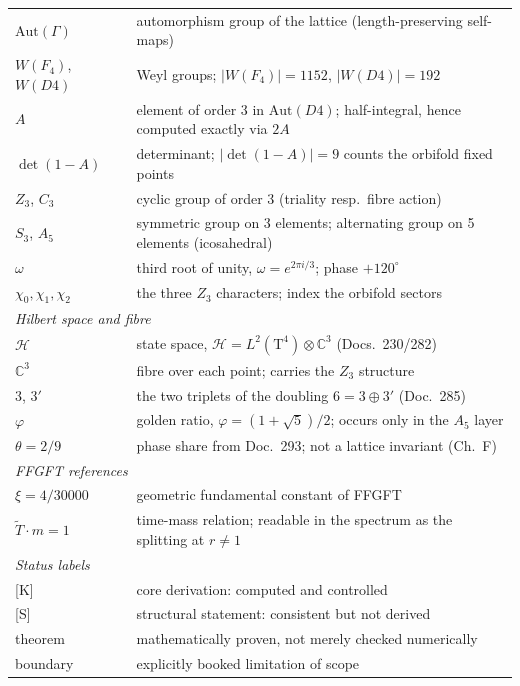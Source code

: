 \begin{center}
{\begin{longtable}{lp{9.6cm}}
$\text{Aut}(\Gamma)$ & automorphism group of the lattice
  (length-preserving self-maps) \\
$W(F_4)$, $W(D4)$ & Weyl groups; $|W(F_4)| = 1152$,
  $|W(D4)| = 192$ \\
$A$ & element of order 3 in $\text{Aut}(D4)$; half-integral, hence
  computed exactly via $2A$ \\
$\det(1-A)$ & determinant; $|\det(1-A)| = 9$ counts the orbifold
  fixed points \\
$Z_3$, $C_3$ & cyclic group of order 3 (triality resp.\ fibre
  action) \\
$S_3$, $A_5$ & symmetric group on 3 elements; alternating group on
  5 elements (icosahedral) \\
$\omega$ & third root of unity, $\omega = e^{2\pi i/3}$;
  phase $+120^\circ$ \\
$\chi_0,\chi_1,\chi_2$ & the three $Z_3$ characters; index the
  orbifold sectors \\
\midrule
\multicolumn{2}{l}{\textit{Hilbert space and fibre}} \\
$\mathcal{H}$ & state space,
  $\mathcal{H} = L^2(\text{T}^4)\otimes\mathbb{C}^3$
  (Docs.~230/282) \\
$\mathbb{C}^3$ & fibre over each point; carries the $Z_3$
  structure \\
$3$, $3'$ & the two triplets of the doubling $6 = 3\oplus3'$
  (Doc.~285) \\
$\varphi$ & golden ratio, $\varphi = (1+\sqrt5)/2$; occurs only in
  the $A_5$ layer \\
$\theta = 2/9$ & phase share from Doc.~293; not a lattice invariant
  (Ch.~F) \\
\midrule
\multicolumn{2}{l}{\textit{FFGFT references}} \\
$\xi = 4/30000$ & geometric fundamental constant of FFGFT \\
$\tilde T\cdot m = 1$ & time-mass relation; readable in the
  spectrum as the splitting at $r \ne 1$ \\
\midrule
\multicolumn{2}{l}{\textit{Status labels}} \\
{}[K] & core derivation: computed and controlled \\
{}[S] & structural statement: consistent but not derived \\
theorem & mathematically proven, not merely checked numerically \\
boundary & explicitly booked limitation of scope \\
\end{longtable}
}
\end{center}


